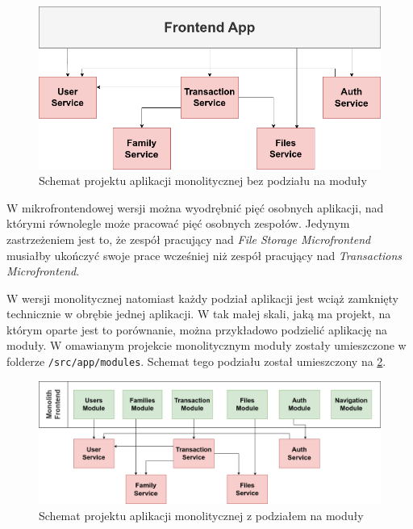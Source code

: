 \documentclass{SGGW-thesis}
\begin{document}
  \begin{figure}[h]
    \centering
    \captionsetup{justification=centering}
    \includegraphics[width=\textwidth]{microservices-app-diagram.png}
    \caption{Schemat projektu aplikacji monolitycznej bez podziału na moduły}
    \label{fig:microservices_fe_diagram}
  \end{figure}

  W mikrofrontendowej wersji można wyodrębnić pięć osobnych aplikacji, nad którymi równolegle może pracować pięć osobnych zespołów. Jedynym zastrzeżeniem jest to, że 
  zespół pracujący nad \textit{File Storage Microfrontend} musiałby ukończyć swoje prace wcześniej niż zespół pracujący nad \textit{Transactions Microfrontend}.

  W wersji monolitycznej natomiast każdy podział aplikacji jest wciąż zamknięty technicznie w obrębie jednej aplikacji. W tak małej skali, jaką ma projekt, na którym oparte jest to porównanie, można przykładowo podzielić aplikację na moduły. W omawianym projekcie monolitycznym moduły zostały umieszczone w folderze \lstinline{/src/app/modules}. Schemat tego podziału został umieszczony na \cref{fig:monolith_fe_modules_diagram}.

  \begin{figure}[h]
    \centering
    \captionsetup{justification=centering}
    \includegraphics[width=\textwidth]{mfe-modules.png}
    \caption{Schemat projektu aplikacji monolitycznej z podziałem na moduły}
    \label{fig:monolith_fe_modules_diagram}
  \end{figure}
\end{document}
